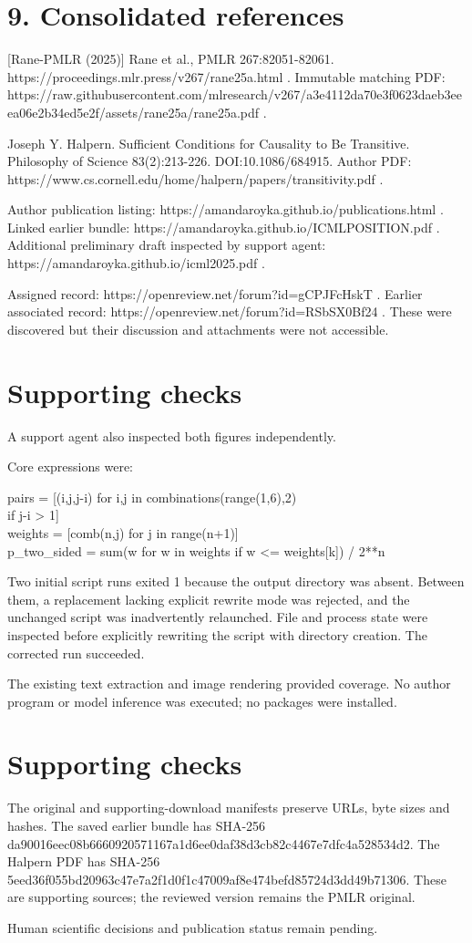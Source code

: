 \documentclass[10pt]{article}
\begin{document}
\section*{9. Consolidated references}
[Rane-PMLR (2025)] Rane et al., PMLR 267:82051-82061. https://proceedings.mlr.press/v267/rane25a.html . Immutable matching PDF: https://raw.githubusercontent.com/mlresearch/v267/a3e4112da70e3f0623daeb3eeea06e2b34ed5e2f/assets/rane25a/rane25a.pdf .\par
[Halpern (2016)] Joseph Y. Halpern. Sufficient Conditions for Causality to Be Transitive. Philosophy of Science 83(2):213-226. DOI:10.1086/684915. Author PDF: https://www.cs.cornell.edu/home/halpern/papers/transitivity.pdf .\par
[Royka-publications] Author publication listing: https://amandaroyka.github.io/publications.html . Linked earlier bundle: https://amandaroyka.github.io/ICMLPOSITION.pdf . Additional preliminary draft inspected by support agent: https://amandaroyka.github.io/icml2025.pdf .\par
[OpenReview] Assigned record: https://openreview.net/forum?id=gCPJFcHskT . Earlier associated record: https://openreview.net/forum?id=RSbSX0Bf24 . These were discovered but their discussion and attachments were not accessible.\par
\section*{Supporting checks}
A support agent also inspected both figures independently.\par
Core expressions were:\par
{\ttfamily\footnotesize pairs = [(i,j,j-i) for i,j in combinations(range(1,6),2)\\
         if j-i > 1]\\
weights = [comb(n,j) for j in range(n+1)]\\
p\_two\_sided = sum(w for w in weights if w <= weights[k]) / 2**n}\par
Two initial script runs exited 1 because the output directory was absent. Between them, a replacement lacking explicit rewrite mode was rejected, and the unchanged script was inadvertently relaunched. File and process state were inspected before explicitly rewriting the script with directory creation. The corrected run succeeded.\par
The existing text extraction and image rendering provided coverage. No author program or model inference was executed; no packages were installed.\par
\section*{Supporting checks}
The original and supporting-download manifests preserve URLs, byte sizes and hashes. The saved earlier bundle has SHA-256 da90016eec08b6660920571167a1d6ee0daf38d3cb82c4467e7dfc4a528534d2. The Halpern PDF has SHA-256 5eed36f055bd20963c47e7a2f1d0f1c47009af8e474befd85724d3dd49b71306. These are supporting sources; the reviewed version remains the PMLR original.\par
Human scientific decisions and publication status remain pending.\par
\end{document}
